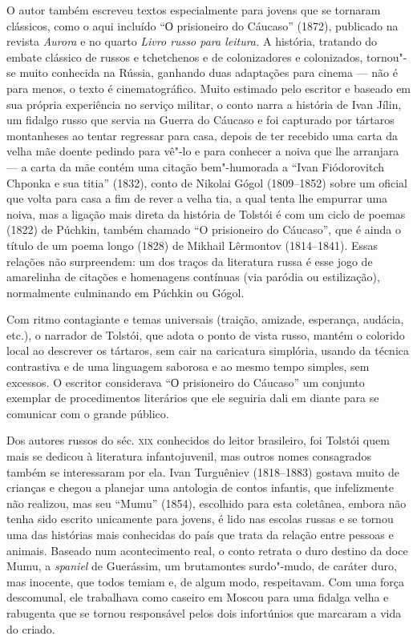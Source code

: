 O autor também escreveu textos especialmente para jovens que se tornaram
clássicos, como o aqui incluído ``О prisioneiro do Cáucaso'' (1872),
publicado na revista \emph{Aurora} e no quarto \emph{Livro russo para
leitura.} A história, tratando do embate clássico de russos e
tchetchenos e de colonizadores e colonizados, tornou"-se muito conhecida
na Rússia, ganhando duas adaptações para cinema --- não é para menos, o
texto é cinematográfico. Muito estimado pelo escritor e baseado em
sua própria experiência no serviço militar, o conto narra a história de
Ivan Jílin, um fidalgo russo que servia na Guerra do Cáucaso e foi
capturado por tártaros montanheses ao tentar regressar para casa, depois
de ter recebido uma carta da velha mãe doente pedindo para vê"-lo e para
conhecer a noiva que lhe arranjara --- a carta da mãe contém uma citação
bem"-humorada a ``Ivan Fiódorovitch Chponka e sua titia''
(1832), conto de Nikolai Gógol (1809--1852) sobre um oficial que volta para casa a fim de rever a velha tia, a qual tenta lhe
empurrar uma noiva, mas a ligação mais direta da história de Tolstói é
com um ciclo de poemas (1822) de Púchkin, também chamado ``O prisioneiro
do Cáucaso'', que é ainda o título de um poema longo (1828) de
Mikhail Lêrmontov (1814--1841). Essas relações não surpreendem: um dos
traços da literatura russa é esse jogo de amarelinha de citações e
homenagens contínuas (via paródia ou estilização), normalmente
culminando em Púchkin ou Gógol.

Com ritmo contagiante e temas universais (traição, amizade, esperança,
audácia, etc.), o narrador de Tolstói, que adota o ponto de vista
russo, mantém o colorido local ao descrever os tártaros, sem cair na
caricatura simplória, usando da técnica contrastiva e de uma linguagem
saborosa e ao mesmo tempo simples, sem excessos. O escritor considerava ``О
prisioneiro do Cáucaso'' um conjunto exemplar de procedimentos
literários que ele seguiria dali em diante para se comunicar com o
grande público.

Dos autores russos do séc. \textsc{xix} conhecidos do leitor brasileiro, foi
Tolstói quem mais se dedicou à literatura infantojuvenil, mas outros
nomes consagrados também se interessaram por ela. Ivan Turguêniev (1818--1883) gostava muito de crianças e chegou a planejar uma antologia de
contos infantis, que infelizmente não realizou, mas seu ``Mumu''
(1854), escolhido para esta coletânea, embora não tenha sido
escrito unicamente para jovens, é lido nas escolas russas e se tornou
uma das histórias mais conhecidas do país que trata da relação entre
pessoas e animais. Baseado num acontecimento real, o conto retrata o duro
destino da doce Mumu, a \emph{spaniel} de Guerássim, um brutamontes
surdo"-mudo, de caráter duro, mas inocente, que todos temiam e, de algum
modo, respeitavam. Com uma força descomunal, ele trabalhava como caseiro
em Moscou para uma fidalga velha e rabugenta que se tornou responsável
pelos dois infortúnios que marcaram a vida do criado.

